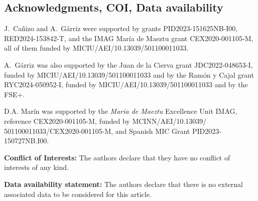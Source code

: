 \documentclass[12pt,longbibliography]{article}
\def\S{\mathbb{S}}
\theoremstyle{definition}
\theoremstyle{remark}
\newtheorem{rem}[thm]{Remark}
\theoremstyle{example}
\begin{document}
%
%

\subsection*{Acknowledgments, COI, Data availability}

J.~Cañizo and A.~Gárriz were supported by grants PID2023-151625NB-I00, RED2024-153842-T, and the IMAG María de Maeztu
grant CEX2020-001105-M, all of them funded by MICIU/AEI/10.13039/501100011033.

A.~Gárriz was also supported by the Juan de la Cierva grant
JDC2022-048653-I, funded by MICIU/AEI/10.13039/501100011033 and by the Ramón y Cajal grant RYC2024-050952-I, funded by MICIU/AEI/10.13039/501100011033 and by the FSE+.

D.A. Marín was supported by the {\it Maria de Maeztu} Excellence Unit IMAG, reference CEX2020-001105-M, funded by MCINN/AEI/10.13039/ 501100011033/CEX2020-001105-M, and Spanish MIC Grant PID2023-150727NB.I00.


\medskip

\textbf{Conflict of Interests: } The authors declare that they have no conflict of interests of any kind.


\medskip

\textbf{Data availability statement: } The authors declare that there is no external associated data to be considered for this article. 



\end{document}
